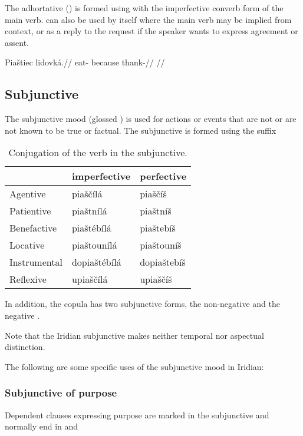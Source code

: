 The adhortative () is formed using  with the imperfective converb form of the main verb.  can also be used by itself where the main verb may be implied from context, or as a reply to the request if the speaker wants to express agreement or assent.

\pex
\begingl
\gla Piaštiec lidovká.//
\glb eat- because thank-//
\glft {}//
\endgl
\xe

\subsection{Subjunctive}

The subjunctive mood (glossed ) is used for actions or events that are not or are not known to be true or factual. The subjunctive is formed using the suffix 

\begin{table}
	\footnotesize\sffamily
	\caption{Conjugation of the verb  in the subjunctive.}
	\begin{tabu}to 0.7\textwidth{YYY}
		\toprule
		&{\cscaps imperfective} &{\cscaps perfective}\\
		\midrule
		Agentive	& piaščílá	& piaščíš\\
		Patientive	& piaštnílá		& piaštníš\\
		Benefactive	& piaštébílá		& piaštebíš\\
		Locative	& piaštounílá		& piaštouníš\\
		Instrumental& dopiaštébílá	& dopiaštebíš\\
		Reflexive	& upiaščílá	& upiaščíš\\
		\bottomrule
	\end{tabu}
\end{table}

In addition, the copula has two subjunctive forms, the non-negative  and the negative .

Note that the Iridian subjunctive makes neither temporal nor aspectual distinction.

\par The following are some specific uses of the subjunctive mood in Iridian:

\subsubsection{Subjunctive of purpose}

Dependent clauses expressing purpose are marked in the subjunctive and normally end in  and 

